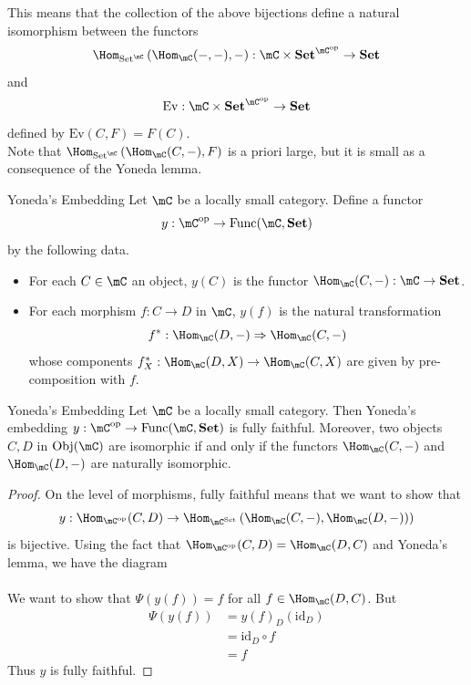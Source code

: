\documentclass[a4paper]{article}
\begin{document}
This means that the collection of the above bijections define a natural isomorphism between the functors $$\Hom_{\text{Set}^\mC}\left(\Hom_\mC(-,-),-\right):\mC\times\bold{Set}^{\mC^\text{op}}\to\bold{Set}$$ and $$\text{Ev}:\mC\times\bold{Set}^{\mC^\text{op}}\to\bold{Set}$$ defined by $\text{Ev}(C,F)=F(C)$. \\

Note that $\Hom_{\text{Set}^\mC}\left(\Hom_\mC(C,-),F\right)$ is a priori large, but it is small as a consequence of the Yoneda lemma. 

\begin{defn}{Yoneda's Embedding}{} Let $\mC$ be a locally small category. Define a functor $$y:\mC^\text{op}\to\text{Func}(\mC,\bold{Set})$$ by the following data. 
\begin{itemize}
\item For each $C\in\mC$ an object, $y(C)$ is the functor $\Hom_\mC(C,-):\mC\to\bold{Set}$. 
\item For each morphism $f:C\to D$ in $\mC$, $y(f)$ is the natural transformation $$f^\ast:\Hom_\mC(D,-)\Rightarrow\Hom_\mC(C,-)$$ whose components $f_X^\ast:\Hom_\mC(D,X)\to\Hom_\mC(C,X)$ are given by pre-composition with $f$. 
\end{itemize}
\end{defn}

\begin{prp}{Yoneda's Embedding}{} Let $\mC$ be a locally small category. Then Yoneda's embedding $y:\mC^\text{op}\to\text{Func}(\mC,\bold{Set})$ is fully faithful. Moreover, two objects $C,D$ in $\text{Obj}(\mC)$ are isomorphic if and only if the functors $\Hom_\mC(C,-)$ and $\Hom_\mC(D,-)$ are naturally isomorphic. 
\begin{proof}
On the level of morphisms, fully faithful means that we want to show that $$y:\Hom_{\mC^{\text{op}}}(C,D)\to\Hom_{\mC^{\text{Set}}}\left(\Hom_\mC(C,-),\Hom_\mC(D,-))\right)$$ is bijective. Using the fact that $\Hom_{\mC^{\text{op}}}(C,D)=\Hom_\mC(D,C)$ and Yoneda's lemma, we have the diagram \\
\\ We want to show that $\Psi(y(f))=f$ for all $f\in\Hom_\mC(D,C)$. But 
\begin{align*}
\Psi(y(f))&=y(f)_D(\text{id}_D)\\
&=\text{id}_D\circ f\\
&=f
\end{align*}
Thus $y$ is fully faithful. 
\end{proof}
\end{prp}
\end{document}
